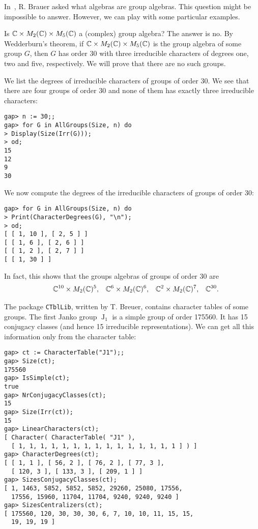In~\cite[Problem 1]{MR0178056}, R. Brauer asked what algebras are group
algebras.  This question might be impossible to answer. However, we can play
with some particular examples.

\begin{example}
	Is $\mathbb{C}\times M_2(\mathbb{C})\times M_{5}(\mathbb{C})$ a (complex) group algebra? The answer is no.  
    By Wedderburn's theorem, if $\mathbb{C}\times M_2(\mathbb{C})\times M_{5}(\mathbb{C})$ is the group algebra of some group $G$, then
	$G$ has order 30 with three 
	irreducible characters of 
	degrees one, two and five, respectively. We will
	prove that there are no such groups.  
	
We list the degrees
of irreducible characters of groups of order $30$. We see that there are four
groups of order $30$ and none of them has exactly three 
irreducible characters: 
\begin{lstlisting}
gap> n := 30;;
gap> for G in AllGroups(Size, n) do
> Display(Size(Irr(G)));
> od;
15
12
9
30
\end{lstlisting}
We now compute the degrees of the irreducible characters
of groups of order 30:
\begin{lstlisting}
gap> for G in AllGroups(Size, n) do
> Print(CharacterDegrees(G), "\n");
> od;
[ [ 1, 10 ], [ 2, 5 ] ]
[ [ 1, 6 ], [ 2, 6 ] ]
[ [ 1, 2 ], [ 2, 7 ] ]
[ [ 1, 30 ] ]
\end{lstlisting}
In fact, this shows that the groups algebras of groups of order $30$
are 
\begin{align*}
  &&\mathbb{C}^{10}\times M_2(\mathbb{C})^5,
  &&\mathbb{C}^{6}\times M_2(\mathbb{C})^6,
  &&\mathbb{C}^{2}\times M_2(\mathbb{C})^7,
  &&\mathbb{C}^{30}.
\end{align*}
\end{example}

\begin{example}
    \label{exa:degreesJ1}
    The package \lstinline{CTblLib}, written by T. Breuer, 
    contains character tables of some groups. The first
    Janko group $\operatorname{J}_1$ is a simple group of 
    order 175560. It has 
    15 conjugacy classes (and hence 15
    irreducible representations). 
    We can get all this information only from the character table:
\begin{lstlisting}
gap> ct := CharacterTable("J1");;
gap> Size(ct);
175560
gap> IsSimple(ct);
true
gap> NrConjugacyClasses(ct);
15
gap> Size(Irr(ct));
15
gap> LinearCharacters(ct);
[ Character( CharacterTable( "J1" ),
  [ 1, 1, 1, 1, 1, 1, 1, 1, 1, 1, 1, 1, 1, 1, 1 ] ) ]
gap> CharacterDegrees(ct);
[ [ 1, 1 ], [ 56, 2 ], [ 76, 2 ], [ 77, 3 ],
  [ 120, 3 ], [ 133, 3 ], [ 209, 1 ] ]
gap> SizesConjugacyClasses(ct);
[ 1, 1463, 5852, 5852, 5852, 29260, 25080, 17556,
  17556, 15960, 11704, 11704, 9240, 9240, 9240 ]
gap> SizesCentralizers(ct);
[ 175560, 120, 30, 30, 30, 6, 7, 10, 10, 11, 15, 15,
  19, 19, 19 ]
\end{lstlisting}
\end{example}

